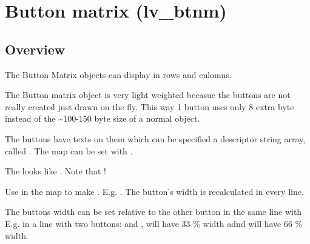 \documentclass[letterpaper,10pt,english]{sphinxmanual}
\begin{document}
\section{Button matrix (lv\_btnm)}
\label{\detokenize{object-types/btnm:button-matrix-lv-btnm}}\label{\detokenize{object-types/btnm::doc}}

\subsection{Overview}
\label{\detokenize{object-types/btnm:overview}}
The Button Matrix objects can display  in rows and culomns.

The Button matrix object is very light weighted becasue the buttons are not really created just drawn on the fly.
This way 1 button uses only 8 extra byte instead of the \textasciitilde{}100-150 byte size of a normal {\hyperref[\detokenize{object-types/btn::doc}]{}} object.

The buttons have texts on them which can be specified a descriptor string array, called . The map can be set with .

The  looks like . Note that !

Use  in the map  to make . E.g. . The button’s width is recalculated in every line.

The buttons width can be set relative to the other button in the same line with 
E.g. in a line with two buttons:  and ,  will have 33 \% width adnd  will have 66 \% width.
\end{document}
